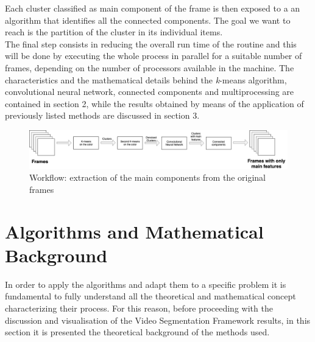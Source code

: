 \documentclass{usiinftr}
\begin{document}
 Each cluster classified as main component of the frame is then exposed to a an algorithm that identifies all the connected components. The goal we want to reach is the partition of the cluster in its individual items.  \\
 The final step consists in reducing the overall run time of the routine and this will be done by executing the whole process in parallel for a suitable number of frames, depending on the number of processors available in the machine.
 The characteristics and the mathematical details behind the \textit{k}-means algorithm, convolutional neural network, connected components and multiprocessing are contained in section 2, while the results obtained by means of the application of previously listed methods are discussed in section 3.  \\
 
 \begin{figure}[h]
 	\centering
 	\includegraphics[width=0.95\linewidth]{img/smallflow}
 	\caption{Workflow: extraction of the main components from the original frames}
 	\label{fig:small}
 \end{figure}
 
 
 
\section{Algorithms and Mathematical Background}
In order to apply the algorithms and adapt them to a specific problem it is fundamental to fully understand all the theoretical and mathematical concept characterizing their process. For this reason, before proceeding with the discussion and visualisation of the Video Segmentation Framework results, in this section it is presented the theoretical background of the methods used.
\end{document}
